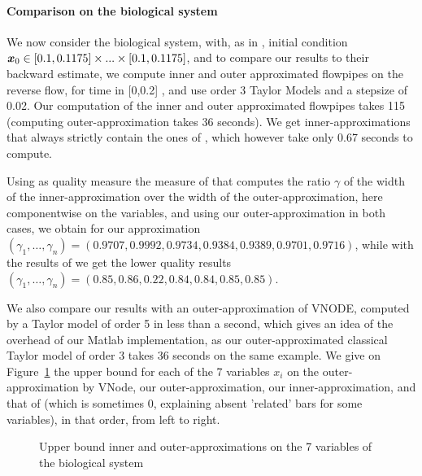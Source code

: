 \paragraph{Comparison on the biological system}
We now consider the biological system, with, as in \cite{underapprox16}, initial condition $\x_0 \in [0.1,0.1175] \times...\times [0.1,0.1175]$, 
and to compare our results to their backward estimate, we compute inner and outer approximated flowpipes on the reverse flow, 
for time in [0,0.2] , and use order 3 Taylor Models and a stepsize of 0.02. Our computation of the inner and outer approximated flowpipes takes 115 
(computing outer-approximation takes 36 seconds). We get inner-approximations that always strictly contain the  ones of \cite{underapprox16}, which however take only 0.67 seconds to compute.

Using as quality measure the measure of  \cite{Underapproxflowpipes} that computes the ratio $\gamma$ of the width of the inner-approximation over the width of the outer-approximation, 
here componentwise on the variables, and using our outer-approximation in both cases, we obtain for our approximation
$(\gamma_1,\ldots,\gamma_n)=(0.9707,   0.9992,   0.9734,   0.9384,   0.9389,   0.9701,   0.9716)$, 
while with the results of \cite{underapprox16} we get the lower quality results
$(\gamma_1,\ldots,\gamma_n)=( 0.85,   0.86,   0.22,   0.84 ,  0.84 ,  0.85,   0.85)$.

We also compare our results with an outer-approximation of VNODE, computed by a Taylor model of order 5 in less than a second, which gives an idea of the overhead of our Matlab implementation, 
as our outer-approximated classical Taylor model of order 3 takes 36 seconds on the same example. We give on Figure~\ref{fig:histo} the upper bound for each of the 7 variables $x_i$ on the outer-approximation by VNode,  
our outer-approximation, our inner-approximation, and that of \cite{underapprox16} (which is sometimes 0, explaining absent 'related' bars for some variables), in that order, from left to right.
\begin{figure}[htbp]
\begin{center}
\end{center}
\caption{Upper bound inner and outer-approximations on the 7 variables of the biological system \label{fig:histo}}
\end{figure}


